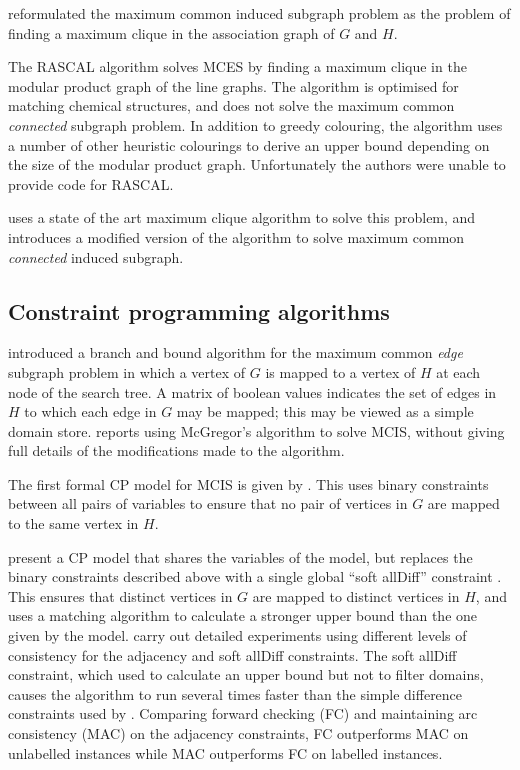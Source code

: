 \citet{LeviG} reformulated the maximum common induced subgraph problem as the problem
of finding a maximum clique in the association graph of $G$ and $H$.

The RASCAL algorithm \citep{raymond2002rascal} solves MCES by finding a maximum
clique in the modular product graph of the line graphs.  The algorithm is
optimised for matching chemical structures, and does not solve the maximum common
\emph{connected} subgraph problem.  In addition to greedy
colouring, the algorithm uses a number of other heuristic colourings to derive
an upper bound depending on the size of the modular product graph.  Unfortunately
the authors were unable to provide code for RASCAL.

\cite{DBLP:conf/cp/McCreeshNPS16} uses a state of the art maximum clique algorithm
to solve this problem, and introduces a modified version of the algorithm to
solve maximum common \emph{connected} induced subgraph.

\subsection{Constraint programming algorithms}

\citet{DBLP:journals/spe/McGregor82}
introduced a branch and bound algorithm for the maximum common
\emph{edge} subgraph problem in which a vertex of $G$ is mapped to a vertex
of $H$ at each node of the search tree.  A matrix of boolean values indicates
the set of edges in $H$ to which each edge in $G$ may be mapped; this may be
viewed as a simple domain store. \citet{DBLP:conf/sspr/BunkeFGSV02}
reports using McGregor's algorithm to solve MCIS, without giving full
details of the modifications made to the algorithm.

The first formal CP model for MCIS is given by \cite{DBLP:conf/mco/VismaraV08}.
This uses binary constraints between all pairs of variables to ensure that
no pair of vertices in $G$ are mapped to the same vertex in $H$.

\citet{DBLP:conf/cp/NdiayeS11} present a CP model that shares the variables
of the \citeauthor{DBLP:conf/mco/VismaraV08} model, but replaces the binary constraints
described above with a single global ``soft allDiff''
constraint \citep{DBLP:conf/cp/PetitRB01}.  This ensures that distinct vertices
in $G$ are mapped to distinct vertices in $H$, and uses a matching algorithm
to calculate a stronger upper bound than the one given by
the \citeauthor{DBLP:conf/mco/VismaraV08} model.
\citeauthor{DBLP:conf/cp/NdiayeS11} carry out detailed experiments using
different levels of consistency for the adjacency and soft allDiff constraints.
The soft allDiff constraint, which used to calculate an upper bound but
not to filter domains, causes the algorithm to run several times faster
than the simple difference constraints used by \citeauthor{DBLP:conf/mco/VismaraV08}.
Comparing forward checking (FC) and maintaining arc consistency (MAC)
on the adjacency constraints, FC outperforms MAC on unlabelled instances
while MAC outperforms FC on labelled instances.

